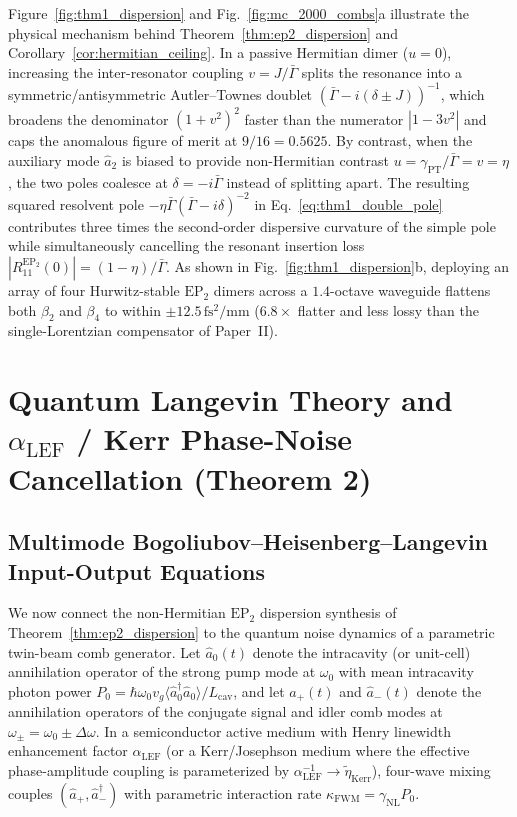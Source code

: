 \documentclass[11pt,letterpaper]{article}
\theoremstyle{definition}
\theoremstyle{remark}
\begin{document}
Figure~\ref{fig:thm1_dispersion} and Fig.~\ref{fig:mc_2000_combs}a illustrate the physical mechanism behind Theorem~\ref{thm:ep2_dispersion} and Corollary~\ref{cor:hermitian_ceiling}. In a passive Hermitian dimer ($u = 0$), increasing the inter-resonator coupling $v = J/\bar{\Gamma}$ splits the resonance into a symmetric/antisymmetric Autler--Townes doublet $(\bar{\Gamma} - i(\delta \pm J))^{-1}$, which broadens the denominator $(1 + v^2)^2$ faster than the numerator $|1 - 3v^2|$ and caps the anomalous figure of merit at $9/16 = 0.5625$. By contrast, when the auxiliary mode $\hat{a}_2$ is biased to provide non-Hermitian contrast $u = \gamma_{\mathrm{PT}}/\bar{\Gamma} = v = \eta$, the two poles coalesce at $\delta = -i\bar{\Gamma}$ instead of splitting apart. The resulting squared resolvent pole $-\eta\bar{\Gamma}(\bar{\Gamma} - i\delta)^{-2}$ in Eq.~\eqref{eq:thm1_double_pole} contributes three times the second-order dispersive curvature of the simple pole while simultaneously cancelling the resonant insertion loss $|R_{11}^{\mathrm{EP}_2}(0)| = (1 - \eta)/\bar{\Gamma}$. As shown in Fig.~\ref{fig:thm1_dispersion}b, deploying an array of four Hurwitz-stable $\mathrm{EP}_2$ dimers across a $1.4$-octave waveguide flattens both $\beta_2$ and $\beta_4$ to within $\pm 12.5\,\mathrm{fs^2/mm}$ ($6.8\times$ flatter and less lossy than the single-Lorentzian compensator of Paper~II).

\section{Quantum Langevin Theory and $\alpha_{\mathrm{LEF}}$ / Kerr Phase-Noise Cancellation (Theorem 2)}
\label{sec:thm2_squeezing}

\subsection{Multimode Bogoliubov--Heisenberg--Langevin Input-Output Equations}

We now connect the non-Hermitian $\mathrm{EP}_2$ dispersion synthesis of Theorem~\ref{thm:ep2_dispersion} to the quantum noise dynamics of a parametric twin-beam comb generator. Let $\hat{a}_0(t)$ denote the intracavity (or unit-cell) annihilation operator of the strong pump mode at $\omega_0$ with mean intracavity photon power $P_0 = \hbar\omega_0 v_g \langle\hat{a}_0^\dagger \hat{a}_0\rangle / L_{\mathrm{cav}}$, and let $\hat{a}_+(t)$ and $\hat{a}_-(t)$ denote the annihilation operators of the conjugate signal and idler comb modes at $\omega_\pm = \omega_0 \pm \Delta\omega$. In a semiconductor active medium with Henry linewidth enhancement factor $\alpha_{\mathrm{LEF}}$ (or a Kerr/Josephson medium where the effective phase-amplitude coupling is parameterized by $\alpha_{\mathrm{LEF}}^{-1} \to \tilde{\eta}_{\mathrm{Kerr}}$), four-wave mixing couples $(\hat{a}_+, \hat{a}_-^\dagger)$ with parametric interaction rate $\kappa_{\mathrm{FWM}} = \gamma_{\mathrm{NL}}P_0$.
\end{document}
